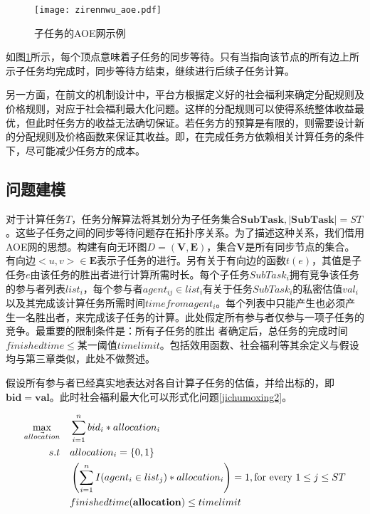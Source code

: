 \documentclass[promaster]{thesis-uestc}
\begin{document}
\begin{figure}[h]
\texttt{[image: zirennwu\_aoe.pdf]}
\caption{子任务的AOE网示例}
\label{zirennwu_aoe}
\end{figure}

如图\ref{zirennwu_aoe}所示，每个顶点意味着子任务的同步等待。只有当指向该节点的所有边上所示子任务均完成时，同步等待方结束，继续进行后续子任务计算。

另一方面，在前文的机制设计中，平台方根据定义好的社会福利来确定分配规则及价格规则，对应于社会福利最大化问题。这样的分配规则可以使得系统整体收益最优，但此时任务方的收益无法确切保证。若任务方的预算是有限的，则需要设计新的分配规则及价格函数来保证其收益。即，在完成任务方依赖相关计算任务的条件下，尽可能减少任务方的成本。

\FloatBarrier

\subsection{问题建模}

对于计算任务$T$，任务分解算法将其划分为子任务集合$\mathbf{SubTask},|\mathbf{SubTask}| = ST$。这些子任务之间的同步等待问题存在拓扑序关系。为了描述这种关系，我们借用AOE网的思想。构建有向无环图$D=(\mathbf{V},\mathbf{E})$，集合$\mathbf{V}$是所有同步节点的集合。有向边$<u,v> \in \mathbf{E}$表示子任务的进行。另有关于有向边的函数$t(e)$，其值是子任务$e$由该任务的胜出者进行计算所需时长。每个子任务$SubTask_i$拥有竞争该任务的参与者列表$list_i$，每个参与者$agent_{ij} \in list_i$有关于任务$SubTask_i$的私密估值$val_i$以及其完成该计算任务所需时间$timefromagent_i$。每个列表中只能产生也必须产生一名胜出者，来完成该子任务的计算。此处假定所有参与者仅参与一项子任务的竞争。最重要的限制条件是：所有子任务的胜出
者确定后，总任务的完成时间$finishedtime \leq $某一阈值$timelimit$。包括效用函数、社会福利等其余定义与假设均与第三章类似，此处不做赘述。

假设所有参与者已经真实地表达对各自计算子任务的估值，并给出标的，即$\mathbf{bid}=\mathbf{val}$。此时社会福利最大化可以形式化问题\ref{jichumoxing2}。

\begin{align}
    \label{jichumoxing2}
    \max_{\vec{allocation}} \quad&\sum_{i=1}^{n}{bid_i*allocation_i}\\
    s.t                     \quad&allocation_i = \{0,1\}\notag\\
    \quad&\left(\sum_{i=1}^{n}{I(agent_i \in list_j)*allocation_i}\right) = 1,\text{for every }1 \leq j \leq ST\notag\\
    \quad&finishedtime(\mathbf{allocation}) \leq timelimit
    \notag
\end{align}
\end{document}
